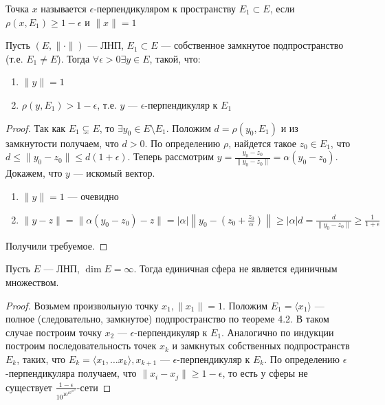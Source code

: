 \begin{definition}
    Точка \(x\) называется \(\epsilon\)-перпендикуляром к пространству \(E_1 \subset E\), если \(\rho(x, E_1) \ge 1 - \epsilon\) и \(\|x\| = 1\)
\end{definition}

\begin{lemma}
    Пусть \((E, \|\cdot\|)\) --- ЛНП, \(E_1 \subset E\) --- собственное замкнутое подпространство (т.е. \(E_1 \ne E\)). Тогда \(\forall \epsilon > 0 \exists y \in E\), такой, что:
    \begin{enumerate}
        \item \(\|y\| = 1\)
        \item \(\rho(y, E_1) > 1 - \epsilon\), т.е. \(y\) --- \(\epsilon\)-перпендикуляр к \(E_1\)
    \end{enumerate}
\end{lemma}
\begin{proof}
    Так как \(E_1 \subsetneq E\), то \(\exists y_0 \in E \setminus E_1\). Положим \(d = \rho(y_0, E_1)\) и из замкнутости получаем, что \(d > 0\). По определению \(\rho\), найдется такое \(z_0 \in E_1\), что \(d \le \|y_0 - z_0\| \le d(1 + \epsilon)\). Теперь рассмотрим \(y = \frac{y_0 - z_0}{\|y_0 - z_0\|} = \alpha(y_0 - z_0)\). Докажем, что \(y\) --- искомый вектор.
    \begin{enumerate}
        \item \(\|y\| = 1\) --- очевидно
        \item \(\|y - z\| = \|\alpha(y_0 - z_0) - z\| = |\alpha|\left\|y_0 - \left( z_0 + \frac{z_0}{\alpha} \right)\right\| \ge |\alpha|d = \frac{d}{\|y_0 - z_0\|} \ge \frac{1}{1 + \epsilon}\)
    \end{enumerate}
    Получили требуемое.
\end{proof}

\begin{theorem}[Рисс]
    Пусть \(E\) --- ЛНП, \(\dim E = \infty\). Тогда единичная сфера не является единичным множеством.
\end{theorem}
\begin{proof}
    Возьмем произвольную точку \(x_1, \|x_1\| = 1\). Положим \(E_1 = \langle x_1 \rangle\) --- полное (следовательно, замкнутое) подпространство по теореме 4.2. В таком случае построим точку \(x_2\) --- \(\epsilon\)-перпендикуляр к \(E_1\). Аналогично по индукции построим последовательность точек \(x_k\) и замкнутых собственных подпространств \(E_k\), таких, что \(E_k = \langle x_1, \dots x_k \rangle, x_{k + 1}\) --- \(\epsilon\)-перпендикуляр к \(E_k\). По определению \(\epsilon\)-перпендикуляра получаем, что \(\|x_i - x_j\| \ge 1 - \epsilon\), то есть у сферы не существует \(\frac{1 - \epsilon}{10^{10^{10^{10^{10}}}}}\)-сети
\end{proof}

